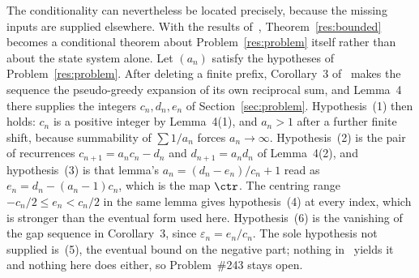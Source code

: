 The conditionality can nevertheless be located precisely, because the missing
inputs are supplied elsewhere.  With the results of~\cite{koizumi2025},
Theorem~\ref{res:bounded} becomes a conditional theorem about
Problem~\ref{res:problem} itself rather than about the state system alone.  Let
$(a_n)$ satisfy the hypotheses of Problem~\ref{res:problem}.  After deleting a
finite prefix, Corollary~3 of~\cite[p.~9]{koizumi2025} makes the sequence the
pseudo-greedy expansion of its own reciprocal sum, and Lemma~4 there supplies
the integers $c_n,d_n,e_n$ of Section~\ref{sec:problem}.  Hypothesis~(1) then
holds: $c_n$ is a positive integer by Lemma~4(1), and $a_n>1$ after a further
finite shift, because summability of $\sum1/a_n$ forces $a_n\to\infty$.
Hypothesis~(2) is the pair of recurrences $c_{n+1}=a_nc_n-d_n$ and
$d_{n+1}=a_nd_n$ of Lemma~4(2), and hypothesis~(3) is that lemma's
$a_n=(d_n-e_n)/c_n+1$ read as $e_n=d_n-(a_n-1)c_n$, which is the map $\ctr$.
The centring range $-c_n/2\le e_n<c_n/2$ in the same lemma gives
hypothesis~(4) at every index, which is stronger than the eventual form used
here.  Hypothesis~(6) is the vanishing
of the gap sequence in Corollary~3, since $\varepsilon_n=e_n/c_n$.  The sole
hypothesis not supplied is~(5), the eventual bound on the negative part;
nothing in~\cite{koizumi2025} yields it and nothing here does either, so
Problem~\#243 stays open.
